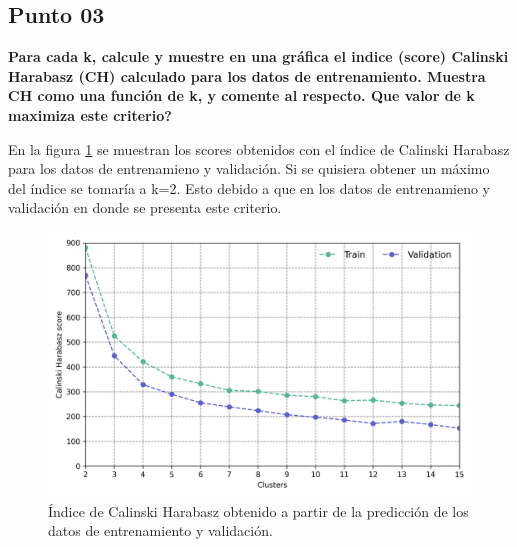 \subsection*{Punto 03}

\textbf{Para cada k, calcule y muestre en una gráfica el indice (score) Calinski Harabasz (CH) calculado para los datos de entrenamiento. Muestra CH como una función de k, y comente al respecto. Que valor de k maximiza este criterio?}

En la figura \ref{fig:problema_03_calinski_score} se muestran los scores obtenidos con el índice de Calinski Harabasz para los datos de entrenamieno y validación. Si se quisiera obtener un máximo del índice se tomaría a k=2. Esto debido a que en los datos de entrenamieno y validación en donde se presenta este criterio.

\begin{figure}[H]
    \centering
    \includegraphics[width=15cm]{Graphics/Problema_03/calinski_harabasz_score.png}
    \caption{Índice de Calinski Harabasz obtenido a partir de la predicción de los datos de entrenamiento y validación.}
    \label{fig:problema_03_calinski_score}
\end{figure}

